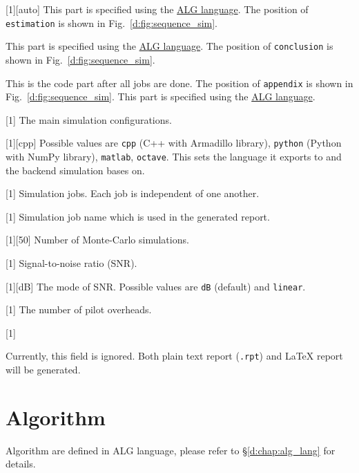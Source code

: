 [1][auto]
This part is specified using the \hyperref[d:chap:alg_lang]{ALG language}.
The position of \texttt{estimation} is shown in Fig.~\ref{d:fig:sequence_sim}.

This part is specified using the \hyperref[d:chap:alg_lang]{ALG language}.
The position of \texttt{conclusion} is shown in Fig.~\ref{d:fig:sequence_sim}.

This is the code part after all jobs are done.
The position of \texttt{appendix} is shown in Fig.~\ref{d:fig:sequence_sim}.
This part is specified using the \hyperref[d:chap:alg_lang]{ALG language}.

[1]
The main simulation configurations.

[1][cpp]
Possible values are
\texttt{cpp} (C++ with Armadillo library),
\texttt{python} (Python with NumPy library),
\texttt{matlab}, \texttt{octave}.
This sets the language it exports to and the backend simulation bases on.

[1]
Simulation jobs.
Each job is independent of one another.

[1]
Simulation job name which is used in the generated report.

[1][50]
Number of Monte-Carlo simulations.

[1]
Signal-to-noise ratio (SNR).

[1][dB]
The mode of SNR. Possible values are \texttt{dB} (default) and \texttt{linear}.

[1]
The number of pilot overheads.

[1]

Currently, this field is ignored.
Both plain text report (\texttt{.rpt})
and \LaTeX{} report will be generated.

\section{Algorithm}

Algorithm are defined in ALG language,
please refer to \S\ref{d:chap:alg_lang} for details.

